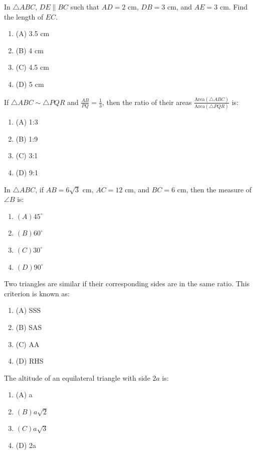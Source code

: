 \documentclass[12pt,a4paper]{exam}
\begin{document}
\begin{questions}
\question[1] In $\triangle ABC$, $DE \parallel BC$ such that $AD = 2\text{ cm}$, $DB = 3\text{ cm}$, and $AE = 3\text{ cm}$. Find the length of $EC$.
\begin{enumerate}[label=(\Alph*)]
  \item (A) 3.5 cm
  \item (B) 4 cm
  \item (C) 4.5 cm
  \item (D) 5 cm
\end{enumerate}
\vspace{0.15cm}

\question[1] If $\triangle ABC \sim \triangle PQR$ and $\frac{AB}{PQ} = \frac{1}{3}$, then the ratio of their areas $\frac{\text{Area}(\triangle ABC)}{\text{Area}(\triangle PQR)}$ is:
\begin{enumerate}[label=(\Alph*)]
  \item (A) 1:3
  \item (B) 1:9
  \item (C) 3:1
  \item (D) 9:1
\end{enumerate}
\vspace{0.15cm}

\question[1] In $\triangle ABC$, if $AB = 6\sqrt{3}\text{ cm}$, $AC = 12\text{ cm}$, and $BC = 6\text{ cm}$, then the measure of $\angle B$ is:
\begin{enumerate}[label=(\Alph*)]
  \item $(A) 45^\circ$
  \item $(B) 60^\circ$
  \item $(C) 30^\circ$
  \item $(D) 90^\circ$
\end{enumerate}
\vspace{0.15cm}

\question[1] Two triangles are similar if their corresponding sides are in the same ratio. This criterion is known as:
\begin{enumerate}[label=(\Alph*)]
  \item (A) SSS
  \item (B) SAS
  \item (C) AA
  \item (D) RHS
\end{enumerate}
\vspace{0.15cm}

\question[1] The altitude of an equilateral triangle with side $2a$ is:
\begin{enumerate}[label=(\Alph*)]
  \item (A) a
  \item $(B) a\sqrt{2}$
  \item $(C) a\sqrt{3}$
  \item (D) 2a
\end{enumerate}
\vspace{0.15cm}


\end{questions}
\end{document}
